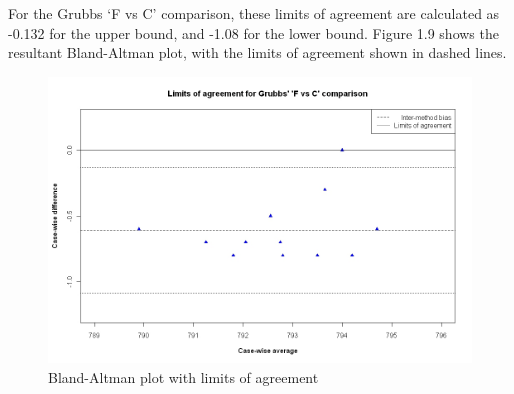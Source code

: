 For the Grubbs `F vs C' comparison, these limits
of agreement are calculated as -0.132 for the upper bound, and
-1.08 for the lower bound. Figure 1.9 shows the resultant
Bland-Altman plot, with the limits of agreement shown in dashed
lines.


\begin{figure}[h!]
\begin{center}
  \includegraphics[width=125mm]{GrubbsBAplot-LOA.jpeg}
  \caption{Bland-Altman plot with limits of agreement}\label{GrubbsBAplot-noLOA}
\end{center}
\end{figure}




